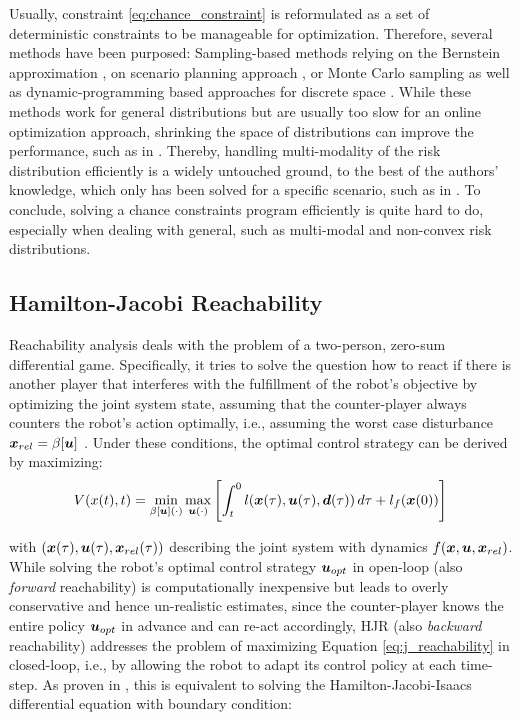 Usually, constraint \ref{eq:chance_constraint} is reformulated as a set of deterministic constraints to be manageable for optimization. Therefore, several methods have been purposed: Sampling-based methods relying on the Bernstein approximation \cite{Calafiore2005}, on scenario planning approach \cite{Bemporad1999}, or Monte Carlo sampling \cite{Hong2011}\cite{Janson2015} as well as dynamic-programming based approaches for discrete space \cite{Chow2013}\cite{Ono2015} \cite{Chow2015a}. While these methods work for general distributions but are usually too slow for an online optimization approach, shrinking the space of distributions can improve the performance, such as in \cite{Chen2018}\cite{Calafiore2006}\cite{Carvalho2014}\cite{Blackmore2009}\cite{Blackmore2011}. Thereby, handling multi-modality of the risk distribution efficiently is a widely untouched ground, to the best of the authors' knowledge, which only has been solved for a specific scenario, such as in \cite{Hu2018}. To conclude, solving a chance constraints program efficiently is quite hard to do, especially when dealing with general, such as multi-modal and non-convex risk distributions.

\subsection{Hamilton-Jacobi Reachability} 
Reachability analysis deals with the problem of a two-person, zero-sum differential game. Specifically, it tries to solve the question how to react if there is another player that interferes with the fulfillment of the robot's objective by optimizing the joint system state, assuming that the counter-player always counters the robot's action optimally, i.e., assuming the worst case disturbance $\boldsymbol{x}_{rel} = \beta[\boldsymbol{u}]$ \cite{Pavone2020}. Under these conditions, the optimal control strategy can be derived by maximizing: \\

\begin{equation}
V(x(t), t) = \min_{\beta[\boldsymbol{u}](\cdot)} \max_{\boldsymbol{u}(\cdot)} \left[ \int_t^0 l(\boldsymbol{x}(\tau), \boldsymbol{u}(\tau), \boldsymbol{d}(\tau)) \, d\tau + l_f(\boldsymbol{x}(0)) \right]
\label{eq:j_reachability}
\end{equation}

with $(\boldsymbol{x}(\tau), \boldsymbol{u}(\tau), \boldsymbol{x}_{rel}(\tau))$ describing the joint system with dynamics $f(\boldsymbol{x}, \boldsymbol{u}, \boldsymbol{x}_{rel})$. While solving the robot's optimal control strategy $\boldsymbol{u}_{opt}$ in open-loop (also \textit{forward} reachability) is computationally inexpensive but leads to overly conservative and hence un-realistic estimates, since the counter-player knows the entire policy $\boldsymbol{u}_{opt}$ in advance and can re-act accordingly, \ac{HJR} (also \textit{backward} reachability) addresses the problem of maximizing Equation \ref{eq:j_reachability} in closed-loop, i.e., by allowing the robot to adapt its control policy at each time-step. As proven in \cite{Pavone2020}, this is equivalent to solving the Hamilton-Jacobi-Isaacs differential equation with boundary condition: \\

